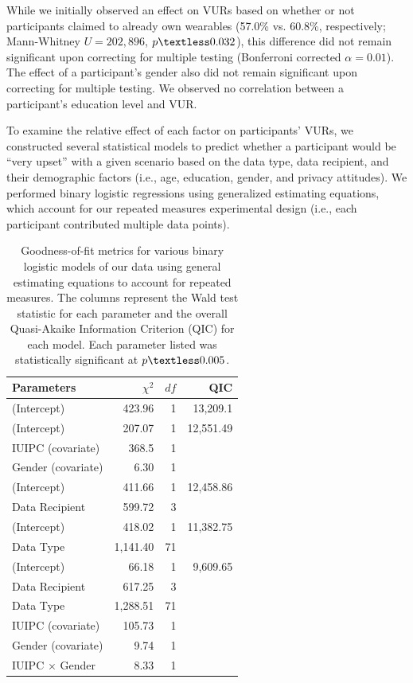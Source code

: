\documentclass[conference]{IEEEtran}
\begin{document}
While we initially observed an effect on VURs based on whether or not participants claimed to already own wearables (57.0\% vs. 60.8\%, respectively; Mann-Whitney $U=202,896$, $p\textless0.032$), this difference did not remain significant upon correcting for multiple testing (Bonferroni corrected $\alpha=0.01$). The effect of a participant's gender also did not remain significant upon correcting for multiple testing. We observed no correlation between a participant's education level and VUR.

\label{sec:regression}
To examine the relative effect of each factor on participants' VURs, we constructed several statistical models to predict whether a participant would be ``very upset'' with a given scenario based on the data type, data recipient, and their demographic factors (i.e., age, education, gender, and privacy attitudes). We performed binary logistic regressions using generalized estimating equations, which account for our repeated measures experimental design (i.e., each participant contributed multiple data points).

\begin{table}[t]
\centering
\begin{tabular}{|l| r| r| r|}
\hline
Parameters & $\chi^2$ & $df$ & QIC\\
\hline
\hline
(Intercept) & 423.96 & 1 & 13,209.1\\
\hline
(Intercept) & 207.07 & 1 & 12,551.49\\
IUIPC (covariate) & 368.5 & 1 & \\
Gender (covariate) & 6.30 & 1 & \\
\hline
(Intercept) & 411.66 & 1 &12,458.86\\
Data Recipient & 599.72 & 3 & \\
\hline
(Intercept) & 418.02 & 1 & 11,382.75\\
Data Type & 1,141.40 & 71 & \\
\hline
(Intercept) & 66.18 & 1 & 9,609.65 \\
Data Recipient & 617.25 & 3 & \\
Data Type & 1,288.51 & 71 & \\
IUIPC (covariate) & 105.73 & 1 & \\
Gender (covariate) & 9.74 & 1 & \\
IUIPC $\times$ Gender & 8.33 & 1 &\\
\hline
\end{tabular}
\caption{Goodness-of-fit metrics for various binary logistic models of our data using general estimating equations to account for repeated measures. The columns represent the Wald test statistic for each parameter and the overall Quasi-Akaike Information Criterion (QIC) for each model. Each parameter listed was statistically significant at $p\textless0.005$.}
\label{regression}
\end{table}
\end{document}
